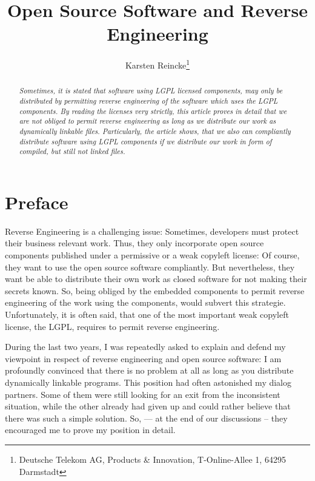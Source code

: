 \documentclass[DIV=calc,BCOR=5mm,12pt,headings=small,oneside,toc=bib]{scrartcl}
\begin{document}

\titlehead{Version 1.0}

\subject{\small \itshape How to Achieve Open Source License Compliance} 

\title{Open Source Software and Reverse Engineering}

\author{
Karsten Reincke\thanks{Deutsche Telekom AG, Products \& Innovation, 
T-Online-Allee 1, 64295 Darmstadt}
}

\maketitle

\normalsize

\begin{abstract}\noindent\emph{Sometimes, it is stated that software using LGPL
licensed components, may only be distributed by permitting reverse engineering
of the software which uses the LGPL components. By reading the licenses very
strictly, this article proves in detail that we are not obliged to permit
reverse engineering as long as we distribute our work as dynamically linkable
files. Particularly, the article shows, that we also can  compliantly distribute
software using LGPL components if we distribute our work in form of compiled,
but still not linked files.}
\end{abstract}

\section{Preface}

Reverse Engineering is a challenging issue: Sometimes, developers must protect
their business relevant work. Thus, they only incorporate open source components
published under a permissive or a weak copyleft license: Of course, they want to
use the open source software compliantly. But nevertheless, they want be able to
distribute their own work as closed software for not making their secrets known.
So, being obliged by the embedded components to permit reverse engineering of
the work using the components, would subvert this strategie. Unfortunately, it
is often said, that one of the most important weak copyleft license, the LGPL,
requires to permit reverse engineering.

During the last two years, I was repeatedly asked to explain and defend my
viewpoint in respect of reverse engineering and open source software: I am
profoundly convinced that there is no problem at all as long as you distribute
dynamically linkable programs. This position had often astonished my dialog
partners. Some of them were still looking for an exit from the inconsistent
situation, while the other already had given up and could rather believe that
there was such a simple solution. So, --- at the end of our discussions -- they
encouraged me to prove my position in detail.
\end{document}
